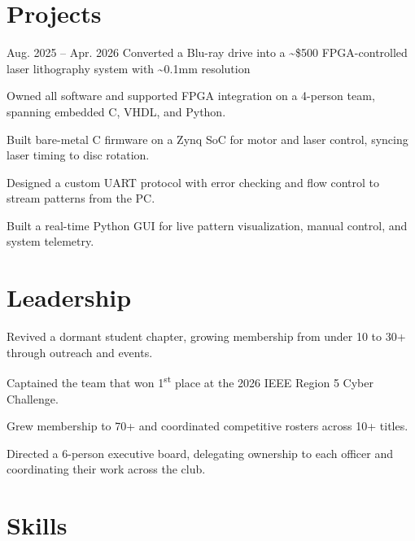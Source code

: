 \documentclass{resume}
\begin{document}
\section{Projects}
  {}{Aug. 2025 -- Apr. 2026}
  {Converted a Blu-ray drive into a \textasciitilde\$500 FPGA-controlled laser lithography system with \textasciitilde0.1mm resolution}
\begin{bullets}
  \item Owned all software and supported FPGA integration on a 4-person team, spanning embedded C, VHDL, and Python.
  \item Built bare-metal C firmware on a Zynq SoC for motor and laser control, syncing laser timing to disc rotation.
  \item Designed a custom UART protocol with error checking and flow control to stream patterns from the PC.
  \item Built a real-time Python GUI for live pattern visualization, manual control, and system telemetry.
\end{bullets}

\section{Leadership}
\begin{bullets}
  \item Revived a dormant student chapter, growing membership from under 10 to 30+ through outreach and events.
  \item Captained the team that won 1\textsuperscript{st} place at the 2026 IEEE Region 5 Cyber Challenge.
\end{bullets}
\begin{bullets}
  \item Grew membership to 70+ and coordinated competitive rosters across 10+ titles.
  \item Directed a 6-person executive board, delegating ownership to each officer and coordinating their work across the club.
\end{bullets}

\section{Skills}
\end{document}
